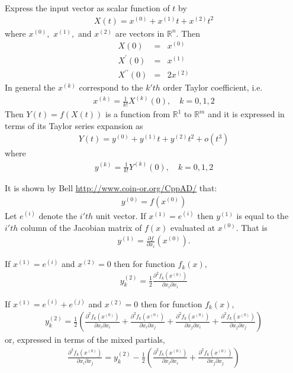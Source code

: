 \documentclass[11pt]{article}
\newcommand{\D}[2]{ \frac{\partial #1}{\partial #2} }
\newcommand{\DD}[3]{ \frac{\partial^2 #1}{\partial #2 \partial #3} }
\renewcommand{\_}{{\char"5F}}
\renewcommand{\{}{{\char"7B}}
\renewcommand{\}}{{\char"7D}}
\renewcommand{\^}{{\char"0D}}
\renewcommand{\'}{{\char"0D}}
\begin{document}
Express the input vector as scalar function of $t$ by
\begin{eqnarray}
X(t) = x^{(0)} +  x^{(1)} t +  x^{(2)} t^{2}
\end{eqnarray}
where $ x^{(0)},$ $x^{(1)},$ and $x^{(2)}$ are vectors in $ \mathbb{R}^{n}.$ Then 
\begin{eqnarray*}
X(0) &=& x^{(0)} \\
X^{\prime}(0) &=& x^{(1)} \\
X^{\prime \prime }(0) &=& 2 x^{(2)}
\end{eqnarray*}
In general the $x^{(k)}$ correspond to the $k'th$ order Taylor coefficient, i.e.
\begin{eqnarray}
x^{(k)} = \frac{1}{k!}X^{(k)}(0), \quad k = 0, 1, 2  \label{eq:xTaylorCoeff}
\end{eqnarray}
Then $Y(t) = f(X(t))$ is a function from $ \mathbb{R}^{1}$ to $ \mathbb{R}^{m}$ and it is expressed in terms of its Taylor series expansion as
\begin{eqnarray}
Y(t)  = y^{(0)} +  y^{(1)} t +  y^{(2)} t^{2} + o(t^{3}) 
\end{eqnarray} 
where 
\begin{eqnarray}
y^{(k)} = \frac{1}{k!} Y^{(k)}(0), \quad k = 0, 1, 2  \label{eq:yTaylorCoeff}
\end{eqnarray}



It is shown by Bell \url{http://www.coin-or.org/CppAD/} that:
\begin{eqnarray}
y^{(0)} = f(x^{(0)}) \label{eq:forward0Result}
\end{eqnarray}
Let $e^{(i)}$ denote the $i'th$ unit vector.  If $x^{(1)} = e^{(i)}$ then $y^{(1)}$ is equal to the $i'th$ column of the Jacobian matrix of $f(x)$ evaluated at $x^{(0)}.$ That is
\begin{eqnarray}
y^{(1)} = \D{f}{x_{i}}(x^{(0)}).  \label{eq:forward1Result}
\end{eqnarray}

If $x^{(1)} = e^{(i)}$ and $x^{(2)} = 0$ then for function $f_{k}(x),$
\begin{eqnarray}
y^{(2)}_{k} =  \frac{1}{2} \DD{f_{k}(x^{(0)})}{x_{i}}{x_{i}}  \label{eq:forward2Resulta}
\end{eqnarray}

If $x^{(1)} = e^{(i)} + e^{(j)}$ and $x^{(2)} = 0$ then for function $f_{k}(x),$
\begin{eqnarray}
y^{(2)}_{k} =  \frac{1}{2} \left( \DD{f_{k}(x^{(0)})}{x_{i}}{x_{i}}  +   \DD{f_{k}(x^{(0)})}{x_{i}}{x_{j}} +  \DD{f_{k}(x^{(0)})}{x_{j}}{x_{i}} +  \DD{f_{k}(x^{(0)})}{x_{j}}{x_{j}}  \right) \label{eq:forward2Resultb}
\end{eqnarray}
or, expressed in terms of the mixed partials,
\begin{eqnarray}
  \DD{f_{k}(x^{(0)})}{x_{i}}{x_{j}}  = y_{k}^{(2)}  -  \frac{1}{2} \left( \DD{f_{k}(x^{(0)})}{x_{i}}{x_{i}}  +  \DD{f_{k}(x^{(0)})}{x_{j}}{x_{j}}  \right) \label{eq:forward2Resultc}
\end{eqnarray}
\end{document}
